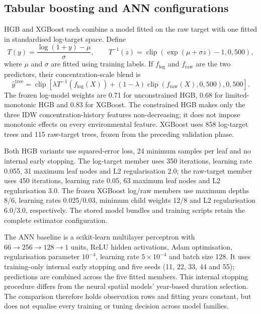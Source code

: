 \documentclass[11pt,a4paper]{article}
\newcommand{\inv}{T^{-1}}
\begin{document}
\subsection{Tabular boosting and ANN configurations}
HGB and XGBoost each combine a model fitted on the raw target with one fitted
in standardised log-target space. Define
\begin{equation}
 T(y)=\frac{\log(1+y)-\mu}{\sigma},\qquad
 \inv(z)=\operatorname{clip}\!\left(\exp(\mu+\sigma z)-1,0,500\right),
 \label{eq:transform}
\end{equation}
where $\mu$ and $\sigma$ are fitted using training labels. If $f_{\log}$ and
$f_{\mathrm{raw}}$ are the two predictors, their concentration-scale blend is
\begin{equation}
 \widehat y^{\mathrm{tree}}=\operatorname{clip}\!\left[
 \lambda\inv(f_{\log}(X))+(1-\lambda)
 \operatorname{clip}(f_{\mathrm{raw}}(X),0,500),0,500\right].
\end{equation}
The frozen log-model weights are 0.71 for unconstrained HGB, 0.68 for
limited-monotonic HGB and 0.83 for XGBoost. The constrained HGB makes only
the three IDW concentration-history features non-decreasing; it does not impose
monotonic effects on every environmental feature. XGBoost uses 858 log-target
trees and 115 raw-target trees, frozen from the preceding validation phase.

Both HGB variants use squared-error loss, 24 minimum samples per leaf and
no internal early stopping. The log-target member uses 350 iterations,
learning rate 0.055, 31 maximum leaf nodes and L2 regularisation 2.0; the
raw-target member uses 450 iterations, learning rate 0.05, 63 maximum leaf
nodes and L2 regularisation 3.0. The frozen XGBoost log/raw members use maximum
depths 8/6, learning rates 0.025/0.03, minimum child weights 12/8 and L2
regularisation 6.0/3.0, respectively. The stored model bundles and training
scripts retain the complete estimator configuration.

The ANN baseline is a scikit-learn multilayer perceptron with
$66\rightarrow256\rightarrow128\rightarrow1$ units, ReLU hidden activations,
Adam optimisation, regularisation parameter $10^{-4}$, learning rate
$5\times10^{-4}$ and batch size 128. It uses training-only internal early
stopping and five seeds (11, 22, 33, 44 and 55); predictions are combined across
the five fitted members. This internal stopping procedure differs from the
neural spatial models' year-based duration selection. The comparison therefore
holds observation rows and fitting years constant, but does not equalise every
training or tuning decision across model families.
\end{document}
